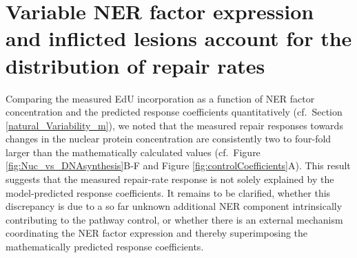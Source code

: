 \section{Variable NER factor expression and inflicted lesions account for the distribution of repair rates} 
\label{sec:variabilityAnalysis}

Comparing the measured EdU incorporation as a function of NER factor concentration and the predicted response coefficients quantitatively (cf.\ Section \ref{natural_Variability_m}), we noted that the measured repair responses towards changes in the nuclear protein concentration are consistently two to four-fold larger than the mathematically calculated values (cf.\ Figure \ref{fig:Nuc_vs_DNAsynthesis}B-F and Figure \ref{fig:controlCoefficients}A). This result suggests that the measured repair-rate response is not solely explained by the model-predicted response coefficients. It remains to be clarified, whether this discrepancy is due to a so far unknown additional NER component intrinsically contributing to the pathway control, or whether there is an external mechanism coordinating the NER factor expression and thereby superimposing the mathematically predicted response coefficients.

